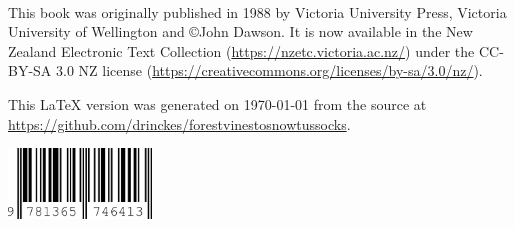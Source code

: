 \thispagestyle{empty}

~\vfill

This book was originally published in 1988 by Victoria University Press, Victoria University of Wellington and ©John Dawson.
It is now available in the New Zealand Electronic Text Collection (\url{https://nzetc.victoria.ac.nz/}) under the CC-BY-SA 3.0 NZ license (\url{https://creativecommons.org/licenses/by-sa/3.0/nz/}).

This \LaTeX{} version was generated on \today{} from the source at \url{https://github.com/drinckes/forestvinestosnowtussocks}.

\vspace{3mm}
\begin{center}
	\includegraphics[width=38mm, keepaspectratio]{graphics/isbn_lulu}
\end{center}
